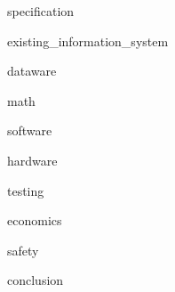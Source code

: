 \documentclass[a4paper,utf8,pointsection,pointsection,nocolumnvii,nocolumnviii,nocolumnsxix]{eskdtext}
\begin{document}






\begin{ESKDtitlePage}\end{ESKDtitlePage}
\tableofcontents
\newpage


{specification}

{existing_information_system}

{dataware}

{math}

{software}

{hardware}

{testing}

{economics}

{safety}

{conclusion}
\end{document}
